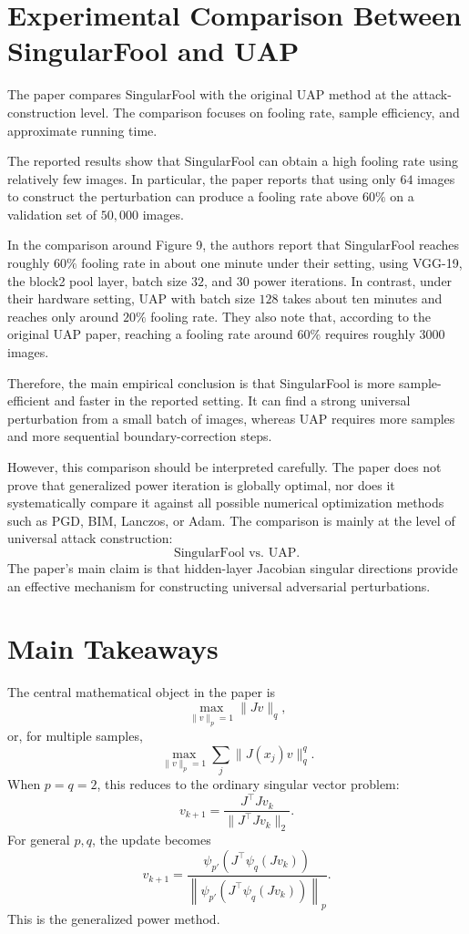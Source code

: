 \documentclass{article}
\begin{document}
\section{Experimental Comparison Between SingularFool and UAP}

The paper compares SingularFool with the original UAP method at the attack-construction level. The comparison focuses on fooling rate, sample efficiency, and approximate running time.

The reported results show that SingularFool can obtain a high fooling rate using relatively few images. In particular, the paper reports that using only \(64\) images to construct the perturbation can produce a fooling rate above \(60\%\) on a validation set of \(50{,}000\) images.

In the comparison around Figure 9, the authors report that SingularFool reaches roughly \(60\%\) fooling rate in about one minute under their setting, using VGG-19, the block2 pool layer, batch size \(32\), and \(30\) power iterations. In contrast, under their hardware setting, UAP with batch size \(128\) takes about ten minutes and reaches only around \(20\%\) fooling rate. They also note that, according to the original UAP paper, reaching a fooling rate around \(60\%\) requires roughly \(3000\) images.

Therefore, the main empirical conclusion is that SingularFool is more sample-efficient and faster in the reported setting. It can find a strong universal perturbation from a small batch of images, whereas UAP requires more samples and more sequential boundary-correction steps.

However, this comparison should be interpreted carefully. The paper does not prove that generalized power iteration is globally optimal, nor does it systematically compare it against all possible numerical optimization methods such as PGD, BIM, Lanczos, or Adam. The comparison is mainly at the level of universal attack construction:
\[
\text{SingularFool vs. UAP}.
\]
The paper's main claim is that hidden-layer Jacobian singular directions provide an effective mechanism for constructing universal adversarial perturbations.

\section{Main Takeaways}

The central mathematical object in the paper is
\[
\max_{\|v\|_p=1}\|Jv\|_q,
\]
or, for multiple samples,
\[
\max_{\|v\|_p=1}
\sum_j
\|J(x_j)v\|_q^q.
\]
When \(p=q=2\), this reduces to the ordinary singular vector problem:
\[
v_{k+1}
=
\frac{J^\top Jv_k}{\|J^\top Jv_k\|_2}.
\]
For general \(p,q\), the update becomes
\[
v_{k+1}
=
\frac{
\psi_{p'}
\left(
J^\top \psi_q(Jv_k)
\right)
}{
\left\|
\psi_{p'}
\left(
J^\top \psi_q(Jv_k)
\right)
\right\|_p
}.
\]
This is the generalized power method.
\end{document}
